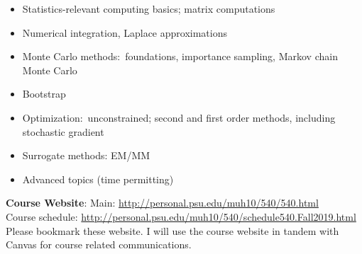\documentclass[10pt]{article}
\begin{document}
\begin{itemize}
\item Statistics-relevant computing basics; matrix computations
\item Numerical integration, Laplace approximations 
\item Monte Carlo methods:\ foundations, importance sampling, Markov
  chain Monte Carlo
\item Bootstrap
\item Optimization:\ unconstrained; second and first order methods, including stochastic gradient
\item Surrogate methods: EM/MM %
\item Advanced topics (time permitting) 
\end{itemize}
{\bf Course Website}: Main:
\url{http://personal.psu.edu/muh10/540/540.html}\\ Course schedule:
\url{http://personal.psu.edu/muh10/540/schedule540.Fall2019.html} Please bookmark these website. I will use the course
website in tandem with Canvas for course related communications. 
\newpage
\end{document}
